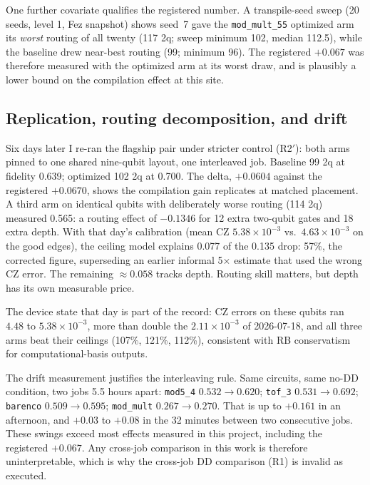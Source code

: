 One further covariate qualifies the registered number. A transpile-seed sweep (20 seeds, level 1, Fez snapshot) shows seed~7 gave the \texttt{mod\_mult\_55} optimized arm its \emph{worst} routing of all twenty (117 2q; sweep minimum 102, median 112.5), while the baseline drew near-best routing (99; minimum 96). The registered $+0.067$ was therefore measured with the optimized arm at its worst draw, and is plausibly a lower bound on the compilation effect at this site.

\subsection{Replication, routing decomposition, and drift}

Six days later I re-ran the flagship pair under stricter control (R2$'$): both arms pinned to one shared nine-qubit layout, one interleaved job. Baseline 99 2q at fidelity 0.639; optimized 102 2q at 0.700. The delta, $+0.0604$ against the registered $+0.0670$, shows the compilation gain replicates at matched placement. A third arm on identical qubits with deliberately worse routing (114 2q) measured 0.565: a routing effect of $-0.1346$ for 12 extra two-qubit gates and 18 extra depth. With that day's calibration (mean CZ $5.38\times10^{-3}$ vs.\ $4.63\times10^{-3}$ on the good edges), the ceiling model explains 0.077 of the 0.135 drop: 57\%, the corrected figure, superseding an earlier informal 5$\times$ estimate that used the wrong CZ error. The remaining $\approx 0.058$ tracks depth. Routing skill matters, but depth has its own measurable price.

The device state that day is part of the record: CZ errors on these qubits ran $4.48$ to $5.38\times10^{-3}$, more than double the $2.11\times10^{-3}$ of 2026-07-18, and all three arms beat their ceilings (107\%, 121\%, 112\%), consistent with RB conservatism for computational-basis outputs.

The drift measurement justifies the interleaving rule. Same circuits, same no-DD condition, two jobs 5.5 hours apart: \texttt{mod5\_4} $0.532 \to 0.620$; \texttt{tof\_3} $0.531 \to 0.692$; \texttt{barenco} $0.509 \to 0.595$; \texttt{mod\_mult} $0.267 \to 0.270$. That is up to $+0.161$ in an afternoon, and $+0.03$ to $+0.08$ in the 32 minutes between two consecutive jobs. These swings exceed most effects measured in this project, including the registered $+0.067$. Any cross-job comparison in this work is therefore uninterpretable, which is why the cross-job DD comparison (R1) is invalid as executed.

